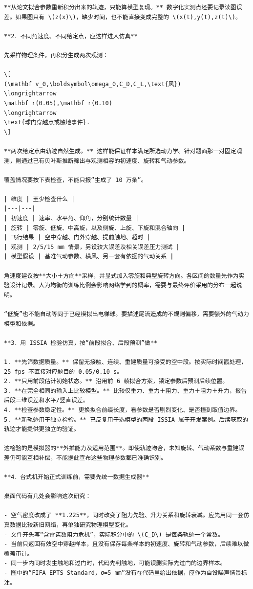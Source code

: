 \documentclass[UTF8,10pt]{ctexart}
\begin{document}
\begin{Verbatim}[breaklines=true,breakanywhere=true,fontsize=\scriptsize,frame=single,framesep=2pt]
**从论文拟合参数重新积分出来的轨迹，只能算模型复现。** 数字化实测点还要记录读图误差。如果图只有 \(z(x)\)，缺少时间，也不能直接变成完整的 \(x(t),y(t),z(t)\)。

**2．不同角速度、不同给定点，应这样进入仿真**

先采样物理条件，再积分生成两次观测：

\[
(\mathbf v_0,\boldsymbol\omega_0,C_D,C_L,\text{风})
\longrightarrow
\mathbf r(0.05),\mathbf r(0.10)
\longrightarrow
\text{球门穿越点或触地事件}.
\]

**两次给定点由轨迹自然生成。** 这样能保证样本满足所选动力学。针对题面那一对固定观测，则通过已有贝叶斯推断筛出与观测相容的初速度、旋转和气动参数。

覆盖情况要按下表检查，不能只报“生成了 10 万条”。

| 维度 | 至少检查什么 |
|---|---|
| 初速度 | 速率、水平角、仰角，分别统计数量 |
| 旋转 | 零旋、低旋、中高旋，以及侧旋、上旋、下旋和混合轴向 |
| 飞行结果 | 空中穿越、门外穿越、提前触地、超时 |
| 观测 | 2/5/15 mm 情景，另设较大误差及相关误差压力测试 |
| 模型假设 | 基准气动参数、横风、另一套有依据的气动关系 |

角速度建议按**大小＋方向**采样，并显式加入零旋和典型旋转方向。各区间的数量先作为实验设计记录。人为均衡的训练比例会影响网络学到的概率，需要与最终评价采用的分布一起说明。

“低旋”也不能自动等同于已经模拟出电梯球。要描述尾流造成的不规则偏移，需要额外的气动力模型和依据。

**3．用 ISSIA 检验仿真，按“前段拟合、后段预测”做**

1. **先筛数据质量。** 保留无接触、连续、重建质量可接受的空中段。按实际时间戳处理，25 fps 不直接对应题目的 0.05/0.10 s。
2. **只用前段估计初始状态。** 沿用前 6 帧拟合方案，锁定参数后预测后续位置。
3. **在完全相同的输入上比较模型。** 比较仅重力、重力＋阻力、重力＋阻力＋升力，报告后段三维误差和水平/竖直误差。
4. **检查参数稳定性。** 更换拟合前缀长度，看参数是否剧烈变化、是否撞到取值边界。
5. **新轨迹用于独立检验。** 已反复用于选模型的两段 ISSIA 属于开发案例。后续获取的轨迹才能提供更独立的验证。

这检验的是模拟器的**外推能力及适用范围**。即使轨迹吻合，未知旋转、气动系数与重建误差仍可能互相补偿，不能据此宣布这些物理参数都已准确识别。

**4．台式机开始正式训练前，需要先统一数据生成器**

桌面代码有几处会影响这次研究：

- 空气密度改成了 **1.225**，同时改变了阻力先验、升力关系和旋转衰减。应先用同一套仿真数据比较新旧网络，再单独研究物理模型变化。
- 文件开头写“含雷诺数阻力危机”，实际积分中的 \(C_D\) 是每条轨迹一个常数。
- 当前只返回有效空中穿越样本，且没有保存每条样本的初速度、旋转和气动参数，后续难以做覆盖审计。
- 同一步内同时发生触地和过门时，代码先判触地，可能误删实际先过门的边界样本。
- 图中的“FIFA EPTS Standard，σ=5 mm”没有在代码里给出依据，应作为自设噪声情景标注。


\end{Verbatim}
\end{document}
